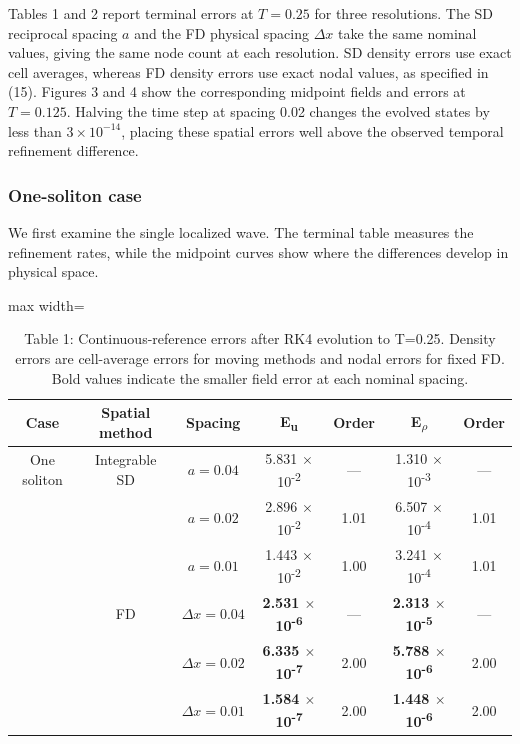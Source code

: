 \documentclass{article}
\begin{document}
Tables 1 and 2 report terminal errors at \(T=0.25\) for three resolutions. The SD reciprocal spacing \(a\) and the FD physical spacing \(\Delta x\) take the same nominal values, giving the same node count at each resolution. SD density errors use exact cell averages, whereas FD density errors use exact nodal values, as specified in (15). Figures 3 and 4 show the corresponding midpoint fields and errors at \(T=0.125\). Halving the time step at spacing 0.02 changes the evolved states by less than \(3\times10^{-14}\), placing these spatial errors well above the observed temporal refinement difference.

\subsubsection*{One-soliton case}

We first examine the single localized wave. The terminal table measures the refinement rates, while the midpoint curves show where the differences develop in physical space.

\begin{table}[!htbp]
\centering
\caption*{Table 1: Continuous-reference errors after RK4 evolution to T=0.25. Density errors are cell-average errors for moving methods and nodal errors for fixed FD. Bold values indicate the smaller field error at each nominal spacing.}
\normalsize
\setlength{\tabcolsep}{6pt}
\renewcommand{\arraystretch}{1.25}\setlength{\extrarowheight}{1pt}
\setlength{\tabcolsep}{4pt}
\begin{adjustbox}{max width=\linewidth}
\begin{tabular}{ccccccc}

\hline
\multicolumn{1}{c}{Case} & \multicolumn{1}{c}{Spatial method} & \multicolumn{1}{c}{Spacing} & \multicolumn{1}{c}{E\textsubscript{u}} & \multicolumn{1}{c}{Order} & \multicolumn{1}{c}{E\textsubscript{\(\rho\)}} & \multicolumn{1}{c}{Order} \\
\hline
One soliton & Integrable SD & \(a=0.04\) & 5.831 \(\times\) 10\textsuperscript{-2} & — & 1.310 \(\times\) 10\textsuperscript{-3} & — \\
 &  & \(a=0.02\) & 2.896 \(\times\) 10\textsuperscript{-2} & 1.01 & 6.507 \(\times\) 10\textsuperscript{-4} & 1.01 \\
 &  & \(a=0.01\) & 1.443 \(\times\) 10\textsuperscript{-2} & 1.00 & 3.241 \(\times\) 10\textsuperscript{-4} & 1.01 \\
 & FD & \(\Delta x=0.04\) & \textbf{2.531 \(\times\) 10\textsuperscript{-6}} & — & \textbf{2.313 \(\times\) 10\textsuperscript{-5}} & — \\
 &  & \(\Delta x=0.02\) & \textbf{6.335 \(\times\) 10\textsuperscript{-7}} & 2.00 & \textbf{5.788 \(\times\) 10\textsuperscript{-6}} & 2.00 \\
 &  & \(\Delta x=0.01\) & \textbf{1.584 \(\times\) 10\textsuperscript{-7}} & 2.00 & \textbf{1.448 \(\times\) 10\textsuperscript{-6}} & 2.00 \\
\hline
\end{tabular}
\end{adjustbox}
\end{table}
\end{document}
